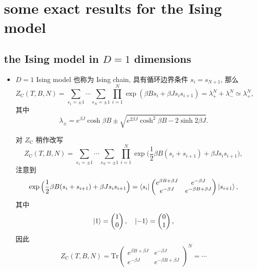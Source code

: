 \section{some exact results for the Ising model}
\subsection{the Ising model in \texorpdfstring{$D = 1$}{D=1} dimensions}
\begin{itemize}
	\item $D = 1$ Ising model 也称为 Ising chain, 具有循环边界条件 $s_i = s_{N + 1}$, 那么
	\begin{equation} \label{11.4.1}
		Z_\text{C}(T, B, N) = \sum_{s_1 = \pm 1} \cdots \sum_{s_N = \pm 1} \prod_{i = 1}^N \exp(\beta B s_i + \beta J s_i s_{i + 1}) = \lambda_+^N + \lambda_-^N \simeq \lambda_+^N,
	\end{equation}
	其中
	\begin{equation}
		\lambda_\pm = e^{\beta J} \cosh \beta B \pm \sqrt{e^{2 \beta J} \cosh^2 \beta B - 2 \sinh 2 \beta J}.
	\end{equation}
	
	\begin{tcolorbox}[title=calculation:]
		对 $Z_\text{C}$ 稍作改写
		\begin{equation}
			Z_\text{C}(T, B, N) = \sum_{s_1 = \pm 1} \cdots \sum_{s_N = \pm 1} \prod_{i = 1}^N \exp \Big( \frac{1}{2} \beta B (s_i + s_{i + 1}) + \beta J s_i s_{i + 1} \Big),
		\end{equation}
		注意到
		\begin{equation}
			\exp \Big( \frac{1}{2} \beta B (s_i + s_{i + 1}) + \beta J s_i s_{i + 1} \Big) = \braket{s_i | \begin{pmatrix}
				e^{\beta B + \beta J} & e^{- \beta J} \\
				e^{- \beta J} & e^{- \beta B + \beta J}
			\end{pmatrix} | s_{i + 1}},
		\end{equation}
		其中
		\begin{equation}
			\ket{1} = \begin{pmatrix}
				1 \\
				0
			\end{pmatrix}, \quad \ket{- 1} = \begin{pmatrix}
				0 \\
				1
			\end{pmatrix},
		\end{equation}
		因此
		\begin{equation}
			Z_\text{C}(T, B, N) = \mathrm{Tr} \begin{pmatrix}
				e^{\beta B + \beta J} & e^{- \beta J} \\
				e^{- \beta J} & e^{- \beta B + \beta J}
			\end{pmatrix}^N = \cdots
		\end{equation}
	\end{tcolorbox}
	

\end{itemize}
